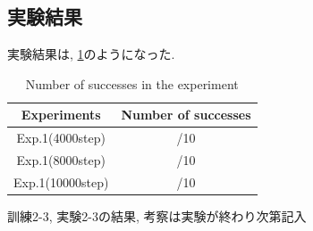 \subsection{実験結果}
実験結果は, \ref{tb:exp4}のようになった. 

\begin{table}[h]
  \centering
  \begin{tabular}{|c|c|} \hline
    Experiments & Number of successes \\ \hline
    Exp.1(4000step) & /10 \\ \hline
    Exp.1(8000step) & /10 \\ \hline
    Exp.1(10000step) & /10 \\ \hline
  \end{tabular}
  \caption{Number of successes in the experiment}
  \label{tb:exp4}
\end{table}

訓練2-3, 実験2-3の結果, 考察は実験が終わり次第記入